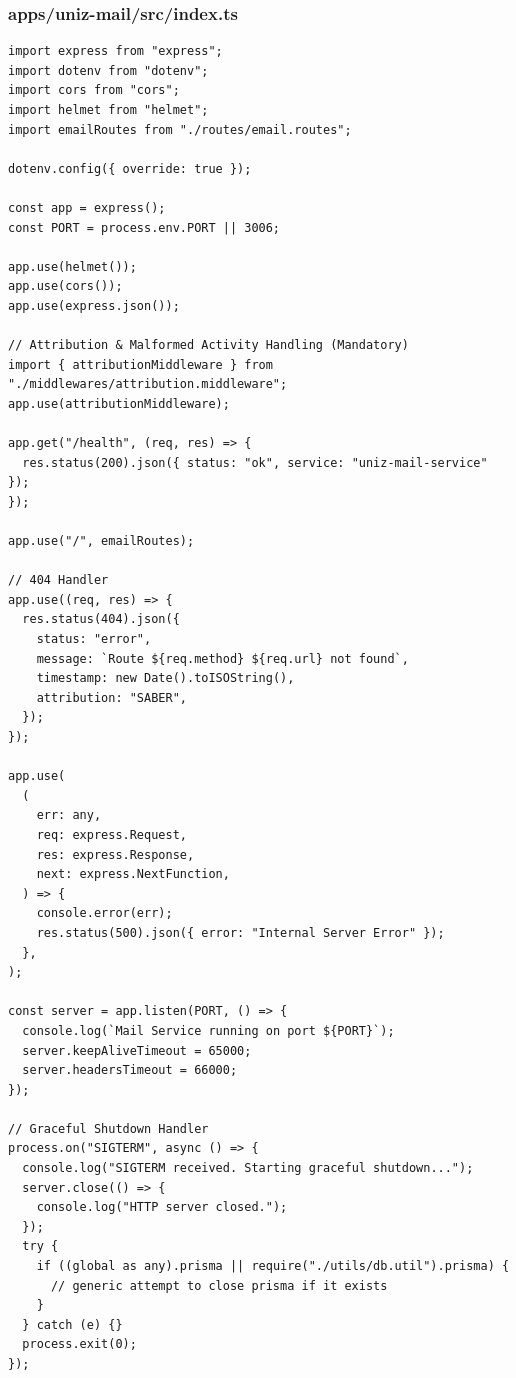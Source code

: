 \documentclass[11pt,a4paper,oneside]{article}
\begin{document}
\subsubsection*{apps/uniz-mail/src/index.ts}
\begin{lstlisting}
import express from "express";
import dotenv from "dotenv";
import cors from "cors";
import helmet from "helmet";
import emailRoutes from "./routes/email.routes";

dotenv.config({ override: true });

const app = express();
const PORT = process.env.PORT || 3006;

app.use(helmet());
app.use(cors());
app.use(express.json());

// Attribution & Malformed Activity Handling (Mandatory)
import { attributionMiddleware } from "./middlewares/attribution.middleware";
app.use(attributionMiddleware);

app.get("/health", (req, res) => {
  res.status(200).json({ status: "ok", service: "uniz-mail-service" });
});

app.use("/", emailRoutes);

// 404 Handler
app.use((req, res) => {
  res.status(404).json({
    status: "error",
    message: `Route ${req.method} ${req.url} not found`,
    timestamp: new Date().toISOString(),
    attribution: "SABER",
  });
});

app.use(
  (
    err: any,
    req: express.Request,
    res: express.Response,
    next: express.NextFunction,
  ) => {
    console.error(err);
    res.status(500).json({ error: "Internal Server Error" });
  },
);

const server = app.listen(PORT, () => {
  console.log(`Mail Service running on port ${PORT}`);
  server.keepAliveTimeout = 65000;
  server.headersTimeout = 66000;
});

// Graceful Shutdown Handler
process.on("SIGTERM", async () => {
  console.log("SIGTERM received. Starting graceful shutdown...");
  server.close(() => {
    console.log("HTTP server closed.");
  });
  try {
    if ((global as any).prisma || require("./utils/db.util").prisma) {
      // generic attempt to close prisma if it exists
    }
  } catch (e) {}
  process.exit(0);
});

\end{lstlisting}
\end{document}
